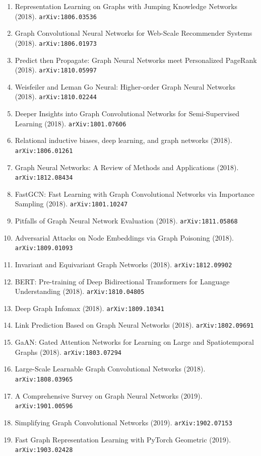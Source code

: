 \documentclass[11pt]{article}
\begin{document}
\begin{enumerate}
  \item Representation Learning on Graphs with Jumping Knowledge Networks (2018). \texttt{arXiv:1806.03536}
  \item Graph Convolutional Neural Networks for Web-Scale Recommender Systems (2018). \texttt{arXiv:1806.01973}
  \item Predict then Propagate: Graph Neural Networks meet Personalized PageRank (2018). \texttt{arXiv:1810.05997}
  \item Weisfeiler and Leman Go Neural: Higher-order Graph Neural Networks (2018). \texttt{arXiv:1810.02244}
  \item Deeper Insights into Graph Convolutional Networks for Semi-Supervised
  Learning (2018). \texttt{arXiv:1801.07606}
  \item Relational inductive biases, deep learning, and graph networks (2018). \texttt{arXiv:1806.01261}
  \item Graph Neural Networks: A Review of Methods and Applications (2018). \texttt{arXiv:1812.08434}
  \item FastGCN: Fast Learning with Graph Convolutional Networks via Importance
  Sampling (2018). \texttt{arXiv:1801.10247}
  \item Pitfalls of Graph Neural Network Evaluation (2018). \texttt{arXiv:1811.05868}
  \item Adversarial Attacks on Node Embeddings via Graph Poisoning (2018). \texttt{arXiv:1809.01093}
  \item Invariant and Equivariant Graph Networks (2018). \texttt{arXiv:1812.09902}
  \item BERT: Pre-training of Deep Bidirectional Transformers for Language
  Understanding (2018). \texttt{arXiv:1810.04805}
  \item Deep Graph Infomax (2018). \texttt{arXiv:1809.10341}
  \item Link Prediction Based on Graph Neural Networks (2018). \texttt{arXiv:1802.09691}
  \item GaAN: Gated Attention Networks for Learning on Large and Spatiotemporal
  Graphs (2018). \texttt{arXiv:1803.07294}
  \item Large-Scale Learnable Graph Convolutional Networks (2018). \texttt{arXiv:1808.03965}
  \item A Comprehensive Survey on Graph Neural Networks (2019). \texttt{arXiv:1901.00596}
  \item Simplifying Graph Convolutional Networks (2019). \texttt{arXiv:1902.07153}
  \item Fast Graph Representation Learning with PyTorch Geometric (2019). \texttt{arXiv:1903.02428}

\end{enumerate}
\end{document}
